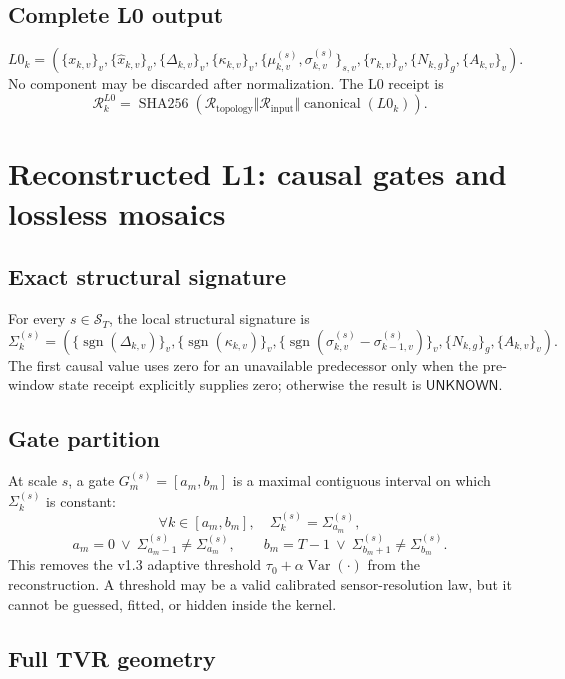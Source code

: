 \documentclass[11pt,oneside]{article}
\newcommand{\sgn}{\operatorname{sgn}}
\newcommand{\sha}{\operatorname{SHA256}}
\newcommand{\Scales}{\mathcal{S}}
\begin{document}
\subsection{Complete L0 output}

\[
  L0_k=
  \left(
    \{x_{k,v}\}_v,
    \{\widehat{x}_{k,v}\}_v,
    \{\Delta_{k,v}\}_v,
    \{\kappa_{k,v}\}_v,
    \{\mu^{(s)}_{k,v},\sigma^{(s)}_{k,v}\}_{s,v},
    \{r_{k,v}\}_v,
    \{N_{k,g}\}_g,
    \{A_{k,v}\}_v
  \right).
\]
No component may be discarded after normalization. The L0 receipt is
\[
  \mathcal{R}^{L0}_k
  =
  \sha\!\left(
    \mathcal{R}_{\mathrm{topology}}
    \Vert \mathcal{R}_{\mathrm{input}}
    \Vert \operatorname{canonical}(L0_k)
  \right).
\]

\section{Reconstructed L1: causal gates and lossless mosaics}

\subsection{Exact structural signature}

For every \(s\in\Scales_T\), the local structural signature is
\[
  \Sigma^{(s)}_k
  =
  \left(
    \{\sgn(\Delta_{k,v})\}_v,
    \{\sgn(\kappa_{k,v})\}_v,
    \{\sgn(\sigma^{(s)}_{k,v}
      -\sigma^{(s)}_{k-1,v})\}_v,
    \{N_{k,g}\}_g,
    \{A_{k,v}\}_v
  \right).
\]
The first causal value uses zero for an unavailable predecessor only when the
pre-window state receipt explicitly supplies zero; otherwise the result is
\(\mathsf{UNKNOWN}\).

\subsection{Gate partition}

At scale \(s\), a gate \(G^{(s)}_m=[a_m,b_m]\) is a maximal contiguous
interval on which \(\Sigma^{(s)}_k\) is constant:
\[
  \forall k\in[a_m,b_m],\quad
  \Sigma^{(s)}_k=\Sigma^{(s)}_{a_m},
\]
\[
  a_m=0\ \lor\
  \Sigma^{(s)}_{a_m-1}\neq\Sigma^{(s)}_{a_m},
  \qquad
  b_m=T-1\ \lor\
  \Sigma^{(s)}_{b_m+1}\neq\Sigma^{(s)}_{b_m}.
\]
This removes the v1.3 adaptive threshold
\(\tau_0+\alpha\operatorname{Var}(\cdot)\) from the reconstruction. A threshold
may be a valid calibrated sensor-resolution law, but it cannot be guessed,
fitted, or hidden inside the kernel.

\subsection{Full TVR geometry}
\end{document}
